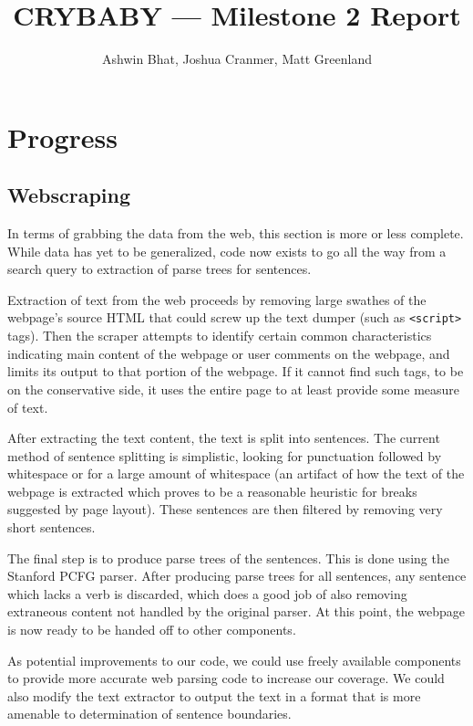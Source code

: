 \documentclass{article}
\title{CRYBABY --- Milestone 2 Report}
\author{Ashwin Bhat, Joshua Cranmer, Matt Greenland}
\begin{document}
\maketitle
\tableofcontents

\section{Progress} %

\subsection{Webscraping}

In terms of grabbing the data from the web, this section is more or less
complete. While data has yet to be generalized, code now exists to go all the
way from a search query to extraction of parse trees for sentences.

Extraction of text from the web proceeds by removing large swathes of the
webpage's source HTML that could screw up the text dumper (such as
\texttt{<script>} tags). Then the scraper attempts to identify certain common
characteristics indicating main content of the webpage or user comments on the
webpage, and limits its output to that portion of the webpage. If it cannot
find such tags, to be on the conservative side, it uses the entire page to at
least provide some measure of text.

After extracting the text content, the text is split into sentences. The current
method of sentence splitting is simplistic, looking for punctuation followed by
whitespace or for a large amount of whitespace (an artifact of how the text of
the webpage is extracted which proves to be a reasonable heuristic for breaks
suggested by page layout). These sentences are then filtered by removing very
short sentences.

The final step is to produce parse trees of the sentences. This is done using
the Stanford PCFG parser. After producing parse trees for all sentences, any
sentence which lacks a verb is discarded, which does a good job of also removing
extraneous content not handled by the original parser. At this point, the
webpage is now ready to be handed off to other components.

As potential improvements to our code, we could use freely available components
to provide more accurate web parsing code to increase our coverage. We could
also modify the text extractor to output the text in a format that is more
amenable to determination of sentence boundaries.
\end{document}
